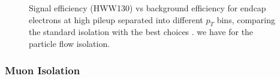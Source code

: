 \begin{figure}[!htbp]
\begin{center}
\caption{Signal efficiency (HWW130) vs background efficiency for endcap electrons at high pileup
separated into different $p_{T}$ bins, comparing the standard isolation with the best choices .
we have for the particle flow isolation.}
\label{fig:IsoPerformance_EleEndcap_BestChoices_HighPU}
\end{center}
\end{figure}

\clearpage


\subsubsection{Muon Isolation}

